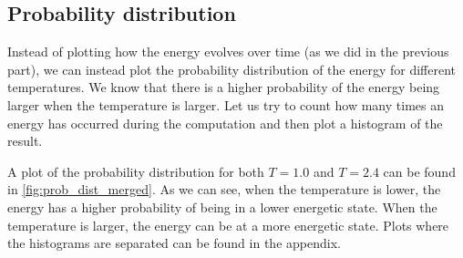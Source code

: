 \documentclass[12pt]{article}
\begin{document}
\FloatBarrier
\subsection{Probability distribution}
Instead of plotting how the energy evolves over time (as we did in the previous part), we can instead plot the probability distribution of the energy for different temperatures. We know that there is a higher probability of the energy being larger when the temperature is larger. Let us try to count how many times an energy has occurred during the computation and then plot a histogram of the result.

A plot of the probability distribution for both $T=1.0$ and $T=2.4$ can be found in \ref{fig:prob_dist_merged}. As we can see, when the temperature is lower, the energy has a higher probability of being in a lower energetic state. When the temperature is larger, the energy can be at a more energetic state. Plots where the histograms are separated can be found in the appendix.
\end{document}
